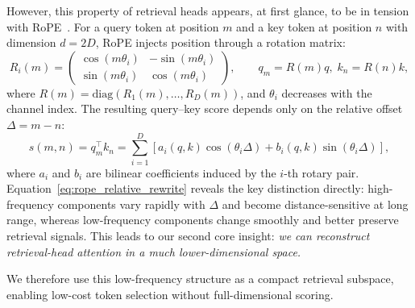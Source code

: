 However, this property of retrieval heads appears, at first glance, to be in tension with RoPE~\citep{rope}. For a query token at position $m$ and a key token at position $n$ with dimension $d = 2D$, RoPE injects position through a rotation matrix:
{\setlength{\abovedisplayskip}{4pt}\setlength{\belowdisplayskip}{4pt}\setlength{\abovedisplayshortskip}{2pt}\setlength{\belowdisplayshortskip}{2pt}
\begin{equation}
\label{eq:rope_pair_rotation}
R_i(m)=
\begin{pmatrix}
\cos(m\theta_i) & -\sin(m\theta_i)\\
\sin(m\theta_i) & \cos(m\theta_i)
\end{pmatrix},
\qquad
q_m=R(m)q,\; k_n=R(n)k,
\end{equation}}
where $R(m)=\mathrm{diag}(R_1(m),\dots,R_D(m))$, and $\theta_i$ decreases with the channel index. The resulting query--key score depends only on the relative offset $\Delta=m-n$:
{\setlength{\abovedisplayskip}{4pt}\setlength{\belowdisplayskip}{4pt}\setlength{\abovedisplayshortskip}{2pt}\setlength{\belowdisplayshortskip}{2pt}
\begin{equation}
\label{eq:rope_relative_rewrite}
s(m,n)=q_m^{\top}k_n
=\sum_{i=1}^{D}\left[a_i(q,k)\cos(\theta_i\Delta) + b_i(q,k)\sin(\theta_i\Delta)\right],
\end{equation}}
where $a_i$ and $b_i$ are bilinear coefficients induced by the $i$-th rotary pair. Equation~\eqref{eq:rope_relative_rewrite} reveals the key distinction directly: high-frequency components vary rapidly with $\Delta$ and become distance-sensitive at long range, whereas low-frequency components change smoothly and better preserve retrieval signals. This leads to our second core insight: \emph{we can reconstruct retrieval-head attention in a much lower-dimensional space.}


We therefore use this low-frequency structure as a compact retrieval subspace, enabling low-cost token selection without full-dimensional scoring.

